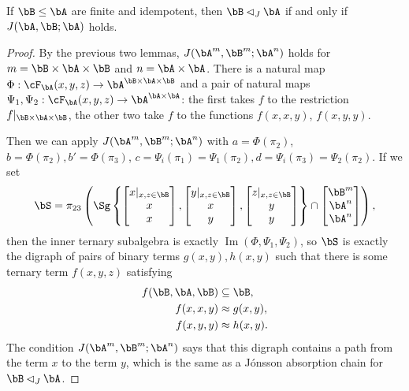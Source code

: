 \begin{thm}\label{local-jonsson} If $\bB \le \bA$ are finite and idempotent, then $\bB \lhd_J \bA$ if and only if $J(\bA,\bB;\bA)$ holds.
\end{thm}
\begin{proof} By the previous two lemmas, $J(\bA^m,\bB^m;\bA^n)$ holds for $m = \bB\times\bA\times\bB$ and $n = \bA\times\bA$. There is a natural map $\Phi: \cF_\bA(x,y,z) \rightarrow \bA^{\bB\times\bA\times\bB}$ and a pair of natural maps $\Psi_1, \Psi_2: \cF_\bA(x,y,z) \rightarrow \bA^{\bA\times\bA}$: the first takes $f$ to the restriction $f|_{\bB\times\bA\times\bB}$, the other two take $f$ to the functions $f(x,x,y)$, $f(x,y,y)$.

Then we can apply $J(\bA^m,\bB^m;\bA^n)$ with $a = \Phi(\pi_2)$, $b = \Phi(\pi_2), b' = \Phi(\pi_3)$, $c = \Psi_i(\pi_1) = \Psi_1(\pi_2), d = \Psi_i(\pi_3) = \Psi_2(\pi_2)$. If we set
\[
\bS = \pi_{23}\left(\Sg\left\{\begin{bmatrix}x|_{x,z\in\bB}\\ x\\ x\end{bmatrix}, \begin{bmatrix} y|_{x,z\in\bB}\\ x\\ y\end{bmatrix}, \begin{bmatrix}z|_{x,z\in\bB}\\ y\\ y\end{bmatrix}\right\}\cap \begin{bmatrix}\bB^m\\ \bA^n\\ \bA^n\end{bmatrix}\right),
\]
then the inner ternary subalgebra is exactly $\operatorname{Im}(\Phi,\Psi_1,\Psi_2)$, so $\bS$ is exactly the digraph of pairs of binary terms $g(x,y),h(x,y)$ such that there is some ternary term $f(x,y,z)$ satisfying
\begin{align*}
f(\bB,\bA,\bB) &\subseteq \bB,\\
f(x,x,y) &\approx g(x,y),\\
f(x,y,y) &\approx h(x,y).
\end{align*}
The condition $J(\bA^m,\bB^m;\bA^n)$ says that this digraph contains a path from the term $x$ to the term $y$, which is the same as a J\'onsson absorption chain for $\bB \lhd_J \bA$.
\end{proof}

